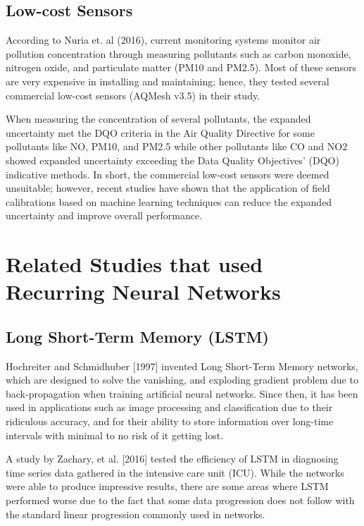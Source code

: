 \documentclass[10pt,11pt,12pt,oneside]{book}
\begin{document}
        \subsection{Low-cost Sensors}
        According to Nuria et. al (2016), current monitoring systems monitor air pollution concentration through measuring pollutants such as carbon monoxide, nitrogen oxide, and particulate matter (PM10 and PM2.5). Most of these sensors are very expensive in installing and maintaining; hence, they tested several commercial low-cost sensors (AQMesh v3.5) in their study. 
        
        When measuring the concentration of several pollutants, the expanded uncertainty met the DQO criteria in the Air Quality Directive for some pollutants like NO, PM10, and PM2.5 while other pollutants like CO and NO2 showed expanded uncertainty exceeding the Data Quality Objectives’ (DQO) indicative methods. In short, the commercial low-cost sensors were deemed unsuitable; however, recent studies have shown that the application of field calibrations based on machine learning techniques can reduce the expanded uncertainty and improve overall performance. \cite{Castell2017}
    \section{Related Studies that used Recurring Neural Networks}
        \subsection{Long Short-Term Memory (LSTM)}
        Hochreiter and Schmidhuber [1997] invented Long Short-Term Memory networks, which are designed to solve the vanishing, and exploding gradient problem due to back-propagation when training artificial neural networks. Since then, it has been used in applications such as image processing and classification due to their ridiculous accuracy, and for their ability to store information over long-time intervals with minimal to no risk of it getting lost. \cite{Hochreiter:1997:LSM:1246443.1246450} 
        
        A study by Zachary, et al. [2016] tested the efficiency of LSTM in diagnosing time series data gathered in the intensive care unit (ICU). While the networks were able to produce impressive results, there are some areas where LSTM performed worse due to the fact that some data progression does not follow with the standard linear progression commonly used in networks. \cite{DBLP:journals/corr/LiptonKEW15}
\end{document}
